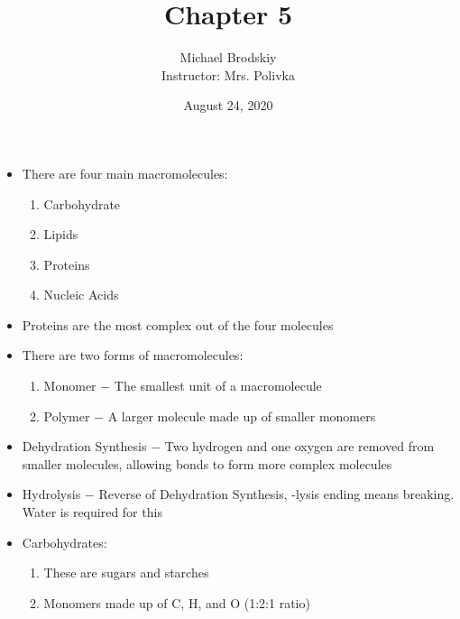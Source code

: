 \documentclass[12pt]{article}
\title{Chapter 5}
\date{August 24, 2020}
\author{Michael Brodskiy\\ \small Instructor: Mrs. Polivka}
\begin{document}
\maketitle

\begin{itemize}

  \item There are four main macromolecules:
    
    \begin{enumerate}

      \item Carbohydrate

      \item Lipids
        
      \item Proteins

      \item Nucleic Acids

    \end{enumerate}

  \item Proteins are the most complex out of the four molecules

  \item There are two forms of macromolecules:

    \begin{enumerate}

      \item Monomer $-$ The smallest unit of a macromolecule

      \item Polymer $-$ A larger molecule made up of smaller monomers

    \end{enumerate}

  \item Dehydration Synthesis $-$ Two hydrogen and one oxygen are removed from smaller molecules, allowing bonds to form more complex molecules

  \item Hydrolysis $-$ Reverse of Dehydration Synthesis, -lysis ending means breaking. Water is required for this

  \item Carbohydrates:

    \begin{enumerate}

      \item These are sugars and starches

      \item Monomers made up of C, H, and O (1:2:1 ratio)


\end{enumerate}
\end{itemize}
\end{document}
